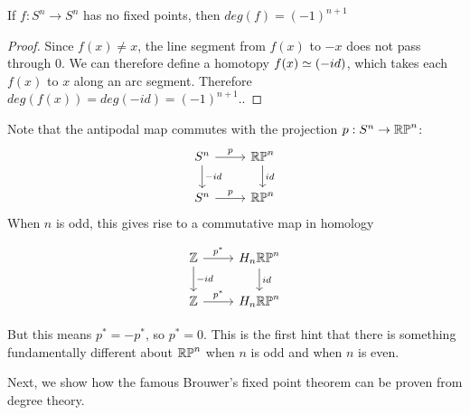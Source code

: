 \begin{corollary}\label{fixed-points}
If $f:S^n\rightarrow S^n$ has no fixed points, then $deg(f)=(-1)^{n+1}$
\end{corollary}
\begin{proof}
Since $f(x)\neq x$, the line segment from $f(x)$ to $-x$ does not pass through $0$. We can therefore define a homotopy $f(x)\simeq (-id)$, which takes each $f(x)$ to $x$ along an arc segment. Therefore $deg(f(x))=deg(-id)=(-1)^{n+1}$.\cite{Hatcher}.
\end{proof}

\begin{remark}
Note that the antipodal map commutes with the projection $p:S^n\rightarrow \mathbb{RP}^{n}$:
\[\begin{tikzcd}
S^n \arrow[r, "p"] \arrow[d, "-id"] & \RP{n} \arrow[d, "id"] \\
S^n \arrow[r, "p"]                    & \RP{n}                
\end{tikzcd}\]
When $n$ is odd, this gives rise to a commutative map in homology

\[\begin{tikzcd}
\mathbb{Z} \arrow[r, "p^*"] \arrow[d, "-id"] & H_n\RP{n} \arrow[d, "id"] \\
\mathbb{Z} \arrow[r, "p^*"]                 & H_n\RP{n}                
\end{tikzcd}\]

But this means $p^*=-p^*$, so $p^*=0$. This is the first hint that there is something fundamentally different about $\mathbb{RP}^{n}$ when $n$ is odd and when $n$ is even. 
\end{remark}


Next, we show how the famous Brouwer's fixed point theorem can be proven from degree theory.

